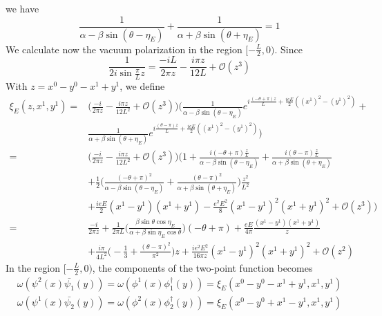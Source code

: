 we have
\begin{equation}\label{nef-lourdeur}
\frac{1}{\alpha - \beta \sin (\theta - \eta_E)}
   + \frac{1}{\alpha + \beta \sin (\theta + \eta_E)} 
= 1
\end{equation}
We calculate now the vacuum polarization in the region $[-\frac{L}{2}, 0)$. Since
\begin{equation*}
\frac{1}{2i \sin \frac{\pi}{L}z } = \frac{-iL}{2 \pi z} - \frac{i \pi z}{12L} + \mathcal{O}(z^3) 
\end{equation*}
With $z = x^0 - y^0 - x^1 + y^1$, we define
\begin{equation}
\begin{split}
\xi_E(z, x^1, y^1) = & \Big( \frac{-i}{2 \pi z} - \frac{i \pi z}{12L^2} + \mathcal{O}(z^3) \Big)
\Big( \frac{1}{\alpha - \beta\sin(\theta - \eta_E)}e^{i\frac{(-\theta + \pi)z}{L} + \frac{ieE}{2}((x^1)^2 - (y^1)^2)} + \\
& \frac{1}{\alpha + \beta\sin(\theta + \eta_E)}e^{i\frac{(\theta - \pi) z}{L} + \frac{ieE}{2}((x^1)^2 - (y^1)^2)} \Big)  \\
= & \Big( \frac{-i}{2 \pi z} - \frac{i \pi z}{12L^2} + \mathcal{O}(z^3) \Big)
\Big( 1 + \frac{i(-\theta + \pi)\frac{z}{L}}{\alpha - \beta\sin(\theta - \eta_E)} + \frac{i(\theta - \pi)\frac{z}{L}}{\alpha + \beta\sin(\theta + \eta_E)}  \\
& + \frac{1}{2}\Big(\frac{(-\theta + \pi)^2}{\alpha - \beta \sin (\theta - \eta_E)}  
+ \frac{(\theta - \pi)^2}{\alpha + \beta \sin (\theta + \eta_E)} \Big)\frac{z^2}{L^2} \\
& + \frac{ieE}{2}(x^1 - y^1)(x^1 + y^1) - \frac{e^2 E^2}{8}(x^1 - y^1)^2 (x^1 + y^1)^2
+ \mathcal{O}(z^3)  \Big)  \\
= & \frac{-i}{2 \pi z} + \frac{1}{2\pi L}\Big( \frac{\beta \sin \theta \cos \eta_E}{\alpha + \beta \sin \eta_E \cos \theta}\Big) (-\theta + \pi) + \frac{eE}{4 \pi}\frac{(x^1 - y^1)(x^1 + y^1)}{z}     \\
& + \frac{i\pi}{4 L^2}\big( -\frac{1}{3} + \frac{(\theta - \pi)^2}{\pi^2}\big)z
+ \frac{i e^2 E^2}{16 \pi z} (x^1 - y^1)^2 (x^1 + y^1)^2
+ \mathcal{O}(z^2)
\end{split}
\end{equation}
In the region $[-\frac{L}{2}, 0)$, the components of the two-point function becomes
\begin{equation*}
\begin{split}
\omega(\psi^2(x) \bar{\psi_1}(y)) = 
\omega(\phi^1(x) \phi^\dagger_1(y)) = \xi_E(x^0 - y^0 - x^1 + y^1, x^1, y^1) \\
 \omega(\psi^1(x) \bar{\psi_2}(y)) = 
\omega(\phi^2(x) \phi^\dagger_2(y)) = \xi_E(x^0 - y^0 + x^1 - y^1, x^1, y^1)
\end{split}
\end{equation*}
